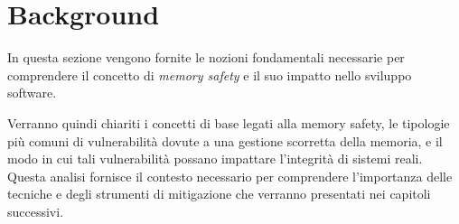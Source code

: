\chapter{Background}
\label{cha:background}

In questa sezione vengono fornite le nozioni fondamentali necessarie per
comprendere il concetto di \textit{memory safety} e il suo impatto nello sviluppo
software.

Verranno quindi chiariti i concetti di base legati alla memory safety, le tipologie
più comuni di vulnerabilità dovute a una gestione scorretta della memoria, e il
modo in cui tali vulnerabilità possano impattare l'integrità di sistemi reali. Questa
analisi fornisce il contesto necessario per comprendere l'importanza delle tecniche
e degli strumenti di mitigazione che verranno presentati nei capitoli successivi.



